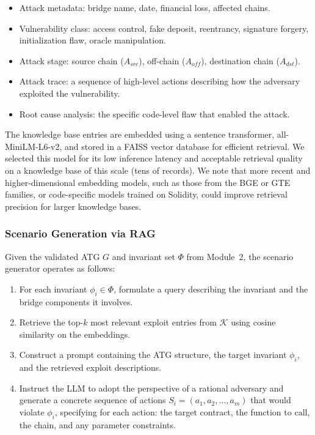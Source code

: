 \documentclass[journal]{IEEEtran}
\begin{document}
\begin{itemize}
    \item Attack metadata: bridge name, date, financial loss, affected chains.
    \item Vulnerability class: access control, fake deposit, reentrancy, signature forgery, initialization flaw, oracle manipulation.
    \item Attack stage: source chain ($A_{src}$), off-chain ($A_{off}$), destination chain ($A_{dst}$).
    \item Attack trace: a sequence of high-level actions describing how the adversary exploited the vulnerability.
    \item Root cause analysis: the specific code-level flaw that enabled the attack.
\end{itemize}

The knowledge base entries are embedded using a sentence transformer, all-MiniLM-L6-v2, and stored in a FAISS vector database for efficient retrieval. We selected this model for its low inference latency and acceptable retrieval quality on a knowledge base of this scale (tens of records). We note that more recent and higher-dimensional embedding models, such as those from the BGE or GTE families, or code-specific models trained on Solidity, could improve retrieval precision for larger knowledge bases.

\subsubsection{Scenario Generation via RAG}

Given the validated ATG $G$ and invariant set $\Phi$ from Module~2, the scenario generator operates as follows:

\begin{enumerate}
    \item For each invariant $\phi_i \in \Phi$, formulate a query describing the invariant and the bridge components it involves.
    \item Retrieve the top-$k$ most relevant exploit entries from $\mathcal{K}$ using cosine similarity on the embeddings.
    \item Construct a prompt containing the ATG structure, the target invariant $\phi_i$, and the retrieved exploit descriptions.
    \item Instruct the LLM to adopt the perspective of a rational adversary and generate a concrete sequence of actions $S_i = (a_1, a_2, \ldots, a_m)$ that would violate $\phi_i$, specifying for each action: the target contract, the function to call, the chain, and any parameter constraints.
\end{enumerate}
\end{document}
